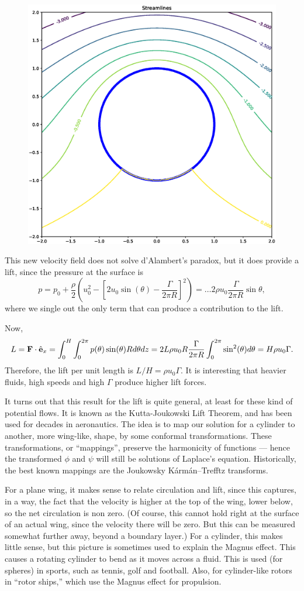 \begin{figure}
  \centering
  \includegraphics[width=0.4\linewidth]{figures/potential_flow_past_cylinder_rotating}
  \caption{\label{fig:}}
\end{figure}


This new velocity field does not solve d'Alambert's paradox, but it
does provide a lift, since the pressure at the surface is
\[
p= p_0 + \frac{\rho}2   \left(u_0^2 -  \left[ 2  u_0 \sin(\theta) - \frac{\Gamma}{2\pi R} \right]^2 \right) =
\ldots  2 \rho u_0   \frac{\Gamma}{2\pi R} \sin\theta ,
\]
where we single out the only term that can produce a contribution to the lift.

Now,
\begin{equation}
  \label{eq:lift_potential_cyl}
  L= \mathbf{F} \cdot \hat{\mathbf{e}}_x = \int_0^H \int_0^{2\pi}
  p(\theta) \sin(\theta) R d\theta dz =
  2 L  \rho u_0  R  \frac{\Gamma}{2\pi R}   \int_0^{2\pi}  \sin^2(\theta) d\theta =
  H \rho u_0   \Gamma .
\end{equation}
Therefore, the lift per unit length is $L/H= \rho u_0 \Gamma$. It is
interesting that heavier fluids, high speeds and high $\Gamma$ produce
higher lift forces.

It turns out that this result for the lift is quite general, at least
for these kind of potential flows. It is known as the Kutta-Joukowski
Lift Theorem, and has been used for decades in aeronautics. The idea
is to map our solution for a cylinder to another, more wing-like,
shape, by some conformal transformations. These transformations, or
``mappings'', preserve the harmonicity of functions --- hence the
transformed $\phi$ and $\psi$ will still be solutions of Laplace's
equation. Historically, the best known mappings are the Joukowsky
K\'arm\'an–Trefftz transforms.

For a plane wing, it makes sense to relate circulation and lift, since
this captures, in a way, the fact that the velocity is higher at the
top of the wing, lower below, so the net circulation is non zero. (Of
course, this cannot hold right at the surface of an actual wing, since
the velocity there will be zero. But this can be measured somewhat
further away, beyond a boundary layer.) For a cylinder, this makes
little sense, but this picture is sometimes used to explain the Magnus
effect. This causes a rotating cylinder to bend as it moves across a
fluid. This is used (for spheres) in sports, such as tennis, golf and
football. Also, for cylinder-like rotors in ``rotor ships,'' which use
the Magnus effect for propulsion.

